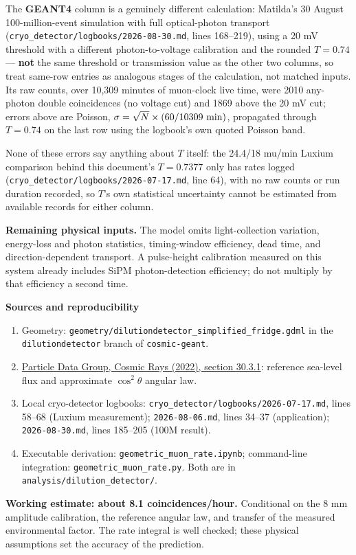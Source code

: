 \documentclass[11pt,a4paper]{article}
\newcommand{\note}[1]{\par\noindent\colorbox{pale}{\parbox{\dimexpr\linewidth-2\fboxsep\relax}{\vspace{4pt}#1\vspace{4pt}}}\par}
\begin{document}
The \textbf{GEANT4} column is a genuinely different calculation: Matilda's
30 August 100-million-event simulation with full optical-photon transport
(\texttt{cryo\_detector/logbooks/2026-08-30.md}, lines 168--219), using a
20 mV threshold with a different photon-to-voltage calibration and the
rounded $T=0.74$ --- \textbf{not} the same threshold or transmission value as
the other two columns, so treat same-row entries as analogous stages of the
calculation, not matched inputs. Its raw counts, over 10{,}309 minutes of
muon-clock live time, were 2010 any-photon double coincidences (no voltage
cut) and 1869 above the 20 mV cut; errors above are Poisson,
$\sigma=\sqrt{N}\times(60/10309\ {\rm min})$, propagated through $T=0.74$ on
the last row using the logbook's own quoted Poisson band.

None of these errors say anything about $T$ itself: the 24.4/18 mu/min Luxium
comparison behind this document's $T=0.7377$ only has rates logged
(\texttt{cryo\_detector/logbooks/2026-07-17.md}, line 64), with no raw counts
or run duration recorded, so $T$'s own statistical uncertainty cannot be
estimated from available records for either column.

\textbf{Remaining physical inputs.}
The model omits light-collection variation, energy-loss and photon statistics,
timing-window efficiency, dead time, and direction-dependent transport.
A pulse-height calibration measured on this system already includes SiPM
photon-detection efficiency; do not multiply by that efficiency a second time.

\textbf{Sources and reproducibility}
\begin{enumerate}
\setlength{\itemsep}{2pt}
\item Geometry: \texttt{geometry/dilutiondetector\_simplified\_fridge.gdml}
in the \texttt{dilutiondetector} branch of \texttt{cosmic-geant}.
\item \href{https://pdgweb.lbl.gov/2022/reviews/rpp2022-rev-cosmic-rays.pdf}
{Particle Data Group, Cosmic Rays (2022), section 30.3.1}:
reference sea-level flux and approximate $\cos^2\theta$ angular law.
\item Local cryo-detector logbooks:
\texttt{cryo\_detector/logbooks/2026-07-17.md}, lines 58--68
(Luxium measurement); \texttt{2026-08-06.md}, lines 34--37
(application); \texttt{2026-08-30.md}, lines 185--205 (100M result).
\item Executable derivation: \texttt{geometric\_muon\_rate.ipynb};
command-line integration: \texttt{geometric\_muon\_rate.py}.
Both are in \texttt{analysis/dilution\_detector/}.
\end{enumerate}

\note{\textbf{Working estimate: about 8.1 coincidences/hour.}
Conditional on the 8 mm amplitude calibration, the reference angular law,
and transfer of the measured environmental factor. The rate integral is
well checked; these physical assumptions set the accuracy of the prediction.}
\end{document}
